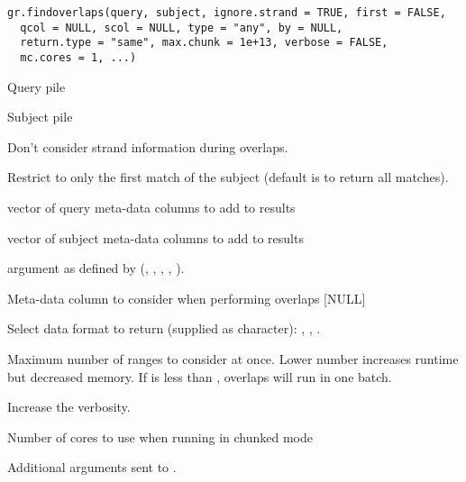 \documentclass[a4paper]{book}
\begin{document}
%
\begin{Usage}
\begin{verbatim}
gr.findoverlaps(query, subject, ignore.strand = TRUE, first = FALSE,
  qcol = NULL, scol = NULL, type = "any", by = NULL,
  return.type = "same", max.chunk = 1e+13, verbose = FALSE,
  mc.cores = 1, ...)
\end{verbatim}
\end{Usage}
%
\begin{Arguments}
\begin{ldescription}
\item[\code{query}] Query  pile

\item[\code{subject}] Subject  pile

\item[\code{ignore.strand}] Don't consider strand information during overlaps. \code{[TRUE]}

\item[\code{first}] Restrict to only the first match of the subject (default is to return all matches). \code{[FALSE]}

\item[\code{qcol}]  vector of query meta-data columns to add to results

\item[\code{scol}]  vector of subject meta-data columns to add to results

\item[\code{type}]  argument as defined by  (, , , , ). \code{["any"]}

\item[\code{by}] Meta-data column to consider when performing overlaps [NULL]

\item[\code{return.type}] Select data format to return (supplied as character): , , . \code{["same"]}

\item[\code{max.chunk}] Maximum number of  ranges to consider at once. Lower number increases runtime but decreased memory. If  is less than , overlaps will run in one batch.\code{[1e13]}

\item[\code{verbose}] Increase the verbosity. \code{[FALSE]}

\item[\code{mc.cores}] Number of cores to use when running in chunked mode

\item[\code{...}] Additional arguments sent to .
\end{ldescription}
\end{Arguments}
\end{document}
